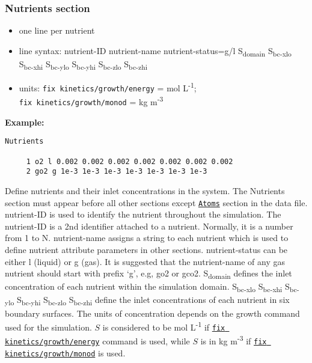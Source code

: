 \documentclass[11pt,a4paper,openright]{article}
\begin{document}
\subsubsection{Nutrients section}
\label{snutrients}

\begin{itemize} [nosep]
    \item one line per nutrient
    \item line syntax: nutrient-ID {} nutrient-name {} nutrient-status=g/l {} S\textsubscript{domain} {} S\textsubscript{bc-xlo} {} S\textsubscript{bc-xhi} {} S\textsubscript{bc-ylo} {} S\textsubscript{bc-yhi} {} S\textsubscript{bc-zlo} {} S\textsubscript{bc-zhi}     
    \item units: {\tt fix kinetics/growth/energy} = mol L\textsuperscript{-1};\\  
    {\tt fix kinetics/growth/monod} =  kg m\textsuperscript{-3}\\
    
\end{itemize} 

\textbf{Example:}
\begin{Verbatim}[frame=single]
 Nutrients

     1 o2 l 0.002 0.002 0.002 0.002 0.002 0.002 0.002
     2 go2 g 1e-3 1e-3 1e-3 1e-3 1e-3 1e-3 1e-3

\end{Verbatim}

Define nutrients and their inlet concentrations in the system.
The Nutrients section must appear before all other sections except \hyperref[satom]{\tt Atoms} section in the data file.
nutrient-ID is used to identify the nutrient throughout the simulation.
The nutrient-ID is a 2nd identifier attached to a nutrient. Normally, it is a number from 1 to N.
nutrient-name assigns a string to each nutrient which is used to define nutrient attribute parameters in 
other sections.
nutrient-status can be either l (liquid) or g (gas).
It is suggested that the nutrient-name of any gas nutrient should start with prefix `g', e.g, go2 or gco2.
S\textsubscript{domain} defines the inlet concentration of each nutrient within the simulation domain.
 S\textsubscript{bc-xlo} {} S\textsubscript{bc-xhi} {} S\textsubscript{bc-ylo} {} S\textsubscript{bc-yhi} {} S\textsubscript{bc-zlo} {} S\textsubscript{bc-zhi} define the inlet concentrations of each nutrient in six boundary surfaces. The units of concentration depends on the growth command used for the simulation. $S$ is considered to be mol L\textsuperscript{-1} if \hyperref[fkineticsenergy]{\tt fix kinetics/growth/energy} command  is used,
while $S$ is in kg m\textsuperscript{-3} if \hyperref[fkineticsmonod]{\tt fix kinetics/growth/monod} is used.  
\end{document}

